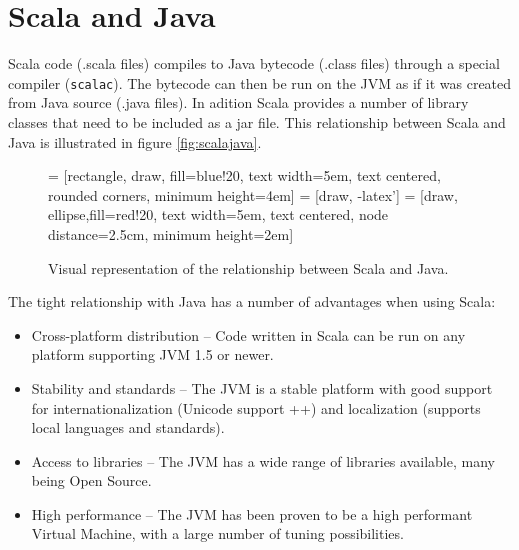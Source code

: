 \documentclass[a4paper,english]{report}
\begin{document}
\section{Scala and Java}
\label{sec:scalajava}

Scala code (.scala files) compiles to Java bytecode (.class files)
through a special compiler (\texttt{scalac}). The bytecode can then be
run on the JVM as if it was created from Java source (.java files). In
adition Scala provides a number of library classes that need to be
included as a jar file. This relationship between Scala and Java is
illustrated in figure \vref{fig:scalajava}.

\begin{figure}
  \begin{center}
   = [rectangle, draw, fill=blue!20, text width=5em, text centered, rounded corners, minimum height=4em]
   = [draw, -latex']
   = [draw, ellipse,fill=red!20, text width=5em, text centered, node distance=2.5cm, minimum height=2em]
  \end{center}
  \caption{Visual representation of the relationship between Scala and
    Java.\label{fig:scalajava}}
\end{figure}

The tight relationship with Java has a number of advantages when using
Scala:

\begin{itemize}
\item Cross-platform distribution -- Code written in Scala can be run
  on any platform supporting JVM 1.5 or newer.
\item Stability and standards -- The JVM is a stable platform with
  good support for internationalization (Unicode support ++) and
  localization (supports local languages and standards).
\item Access to libraries -- The JVM has a wide range of libraries
  available, many being Open Source.
\item High performance -- The JVM has been proven to be a high
  performant Virtual Machine, with a large number of tuning
  possibilities.
\end{itemize}
\end{document}
